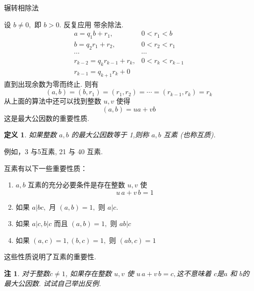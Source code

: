 \documentclass[11pt,punct]{ctexbeamer}
\newtheorem*{defi}{定义}
\newtheorem*{rem}{注}
\begin{document}
\begin{frame}{辗转相除法}

设 $b \neq 0,$ 即 $b>0 .$ 反复应用 带余除法.
	\[
	\begin{array}{cc}
	a=q_{1} b+r_{1}, & 0<r_{1}<b \\
	b=q_{2} r_{1}+r_{2}, & 0<r_{2}<r_{1} \\
	\cdots  & \cdots  \\
	r_{k-2}=q_{k} r_{k-1}+r_{k}, & 0<r_{k}<r_{k-1} \\
	r_{k-1}=q_{k+1} r_{k}+0
	\end{array}
	\]
	直到出现余数为零而终止. 则有
	\[
	(a, b)=\left(b, r_{1}\right)=\left(r_{1}, r_{2}\right)=\cdots=\left(r_{k-1}, r_{k}\right)=r_{k}
	\]
	从上面的算法中还可以找到整数 $u, v$ 使得
	\[
	(a, b)=u a+v b
	\]
	这是最大公因数的重要性质.


\end{frame}


\begin{frame}
\begin{defi}
	如果整数 $a, b$ 的最大公因数等于 1,则称 $a, b$ \alert{互素} (也称互质).
\end{defi}
例如，3 与5互素, 21 与 40 互素.

互素有以下一些重要性质：
\begin{enumerate}
\item $a ,b$ 互素的充分必要条件是存在整数 $u, v$ 使
\[
u \, a+v\,  b=1
\]
\item 如果 $a | b c,$ 月 $(a, b)=1,$ 则 $a | c$.
\item 如果 $a|c, b| c$ 而且 $(a, b)=1,$ 则 $a b | c$
\item 如果 $(a, c)=1,(b, c)=1,$ 则 $(a b, c)=1$
\end{enumerate}
这些性质说明了互素的重要性.

    \begin{rem}
    对于整数$c\neq 1$, 如果存在整数 $u, v$ 使
    $
    u\, a+v\,  b=c,
    $这不意味着 $c$是$a$ 和 $b$的最大公因数. 试试自己举出反例.
\end{rem}
\end{frame}
\end{document}
